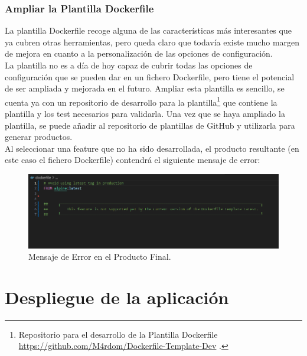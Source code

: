 \documentclass[12pt, a4paper, twoside]{article}
\begin{document}
\subsubsection{Ampliar la Plantilla Dockerfile}
La plantilla Dockerfile recoge alguna de las características más interesantes que ya cubren otras herramientas, pero queda claro que todavía existe mucho margen de mejora en cuanto a la personalización de las opciones de configuración.
\\La plantilla no es a día de hoy capaz de cubrir todas las opciones de configuración que se pueden dar en un fichero Dockerfile, pero tiene el potencial de ser ampliada y mejorada en el futuro.
Ampliar esta plantilla es sencillo, se cuenta ya con un repositorio de desarrollo para la plantilla\footnote{Repositorio para el desarrollo de la Plantilla Dockerfile \url{https://github.com/M4rdom/Dockerfile-Template-Dev} \cite{Dockerfile_template_dev}.} que contiene la plantilla y los test necesarios para validarla.
Una vez que se haya ampliado la plantilla, se puede añadir al repositorio de plantillas de GitHub y utilizarla para generar productos.
\\Al seleccionar una feature que no ha sido desarrollada, el producto resultante (en este caso el fichero Dockerfile) contendrá el siguiente mensaje de error:

\begin{figure}[h]
	\centering
	  \includegraphics[width=1\textwidth]{unupportedfeature.png}
	\caption{Mensaje de Error en el Producto Final.}
\end{figure}








\section{Despliegue de la aplicación }
\label{sec:Despliegue de la aplicación}
\end{document}

